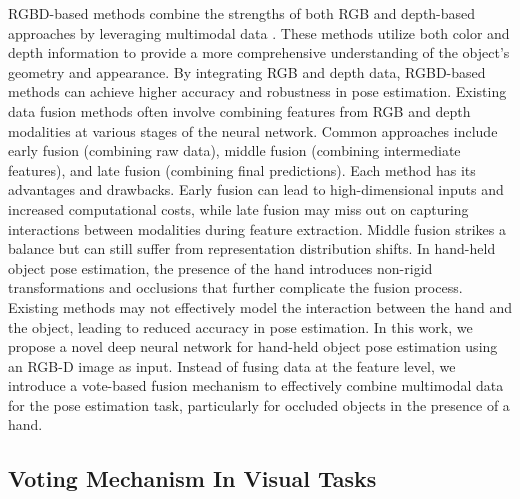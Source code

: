 RGBD-based methods combine the strengths of both RGB and depth-based approaches by leveraging multimodal data \cite{wang2019densefusion, he2020pvn3d, hong2024rdpn6d}. These methods utilize both color and depth information to provide a more comprehensive understanding of the object's geometry and appearance. By integrating RGB and depth data, RGBD-based methods can achieve higher accuracy and robustness in pose estimation. Existing data fusion methods often involve combining features from RGB and depth modalities at various stages of the neural network. Common approaches include early fusion (combining raw data), middle fusion (combining intermediate features), and late fusion (combining final predictions). Each method has its advantages and drawbacks. Early fusion can lead to high-dimensional inputs and increased computational costs, while late fusion may miss out on capturing interactions between modalities during feature extraction. Middle fusion strikes a balance but can still suffer from representation distribution shifts. In hand-held object pose estimation, the presence of the hand introduces non-rigid transformations and occlusions that further complicate the fusion process. Existing methods may not effectively model the interaction between the hand and the object, leading to reduced accuracy in pose estimation. In this work, we propose a novel deep neural network for hand-held object pose estimation using an RGB-D image as input. Instead of fusing data at the feature level, we introduce a vote-based fusion mechanism to effectively combine multimodal data for the pose estimation task, particularly for occluded objects in the presence of a hand. 

\subsection{Voting Mechanism In Visual Tasks}

